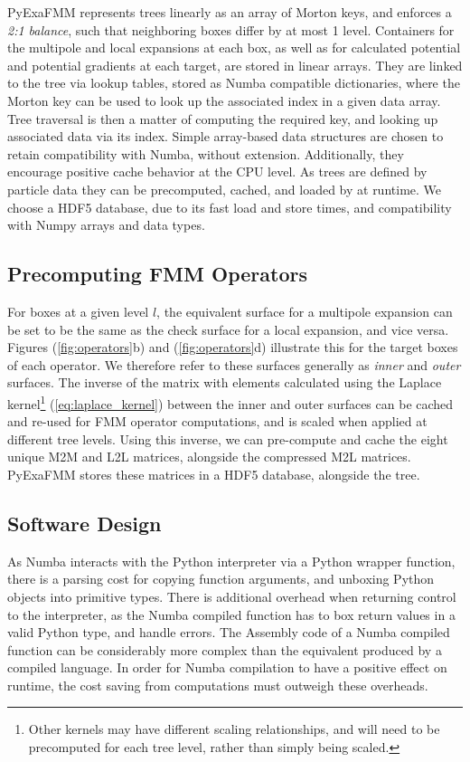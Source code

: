 \documentclass{IEEEcsmag}
\begin{document}
PyExaFMM represents trees linearly as an array of Morton keys, and enforces a \textit{2:1 balance}, such that neighboring boxes differ by at most 1 level. Containers for the multipole and local expansions at each box, as well as for calculated potential and potential gradients at each target, are stored in linear arrays. They are linked to the tree via lookup tables, stored as Numba compatible dictionaries, where the Morton key can be used to look up the associated index in a given data array. Tree traversal is then a matter of computing the required key, and looking up associated data via its index. Simple array-based data structures are chosen to retain compatibility with Numba, without extension. Additionally, they encourage positive cache behavior at the CPU level. As trees are defined by particle data they can be precomputed, cached, and loaded by at runtime. We choose a HDF5 database, due to its fast load and store times, and compatibility with Numpy arrays and data types.

\subsection{Precomputing FMM Operators}

For boxes at a given level $l$, the equivalent surface for a multipole expansion can be set to be the same as the check surface for a local expansion, and vice versa. Figures (\ref{fig:operators}b) and (\ref{fig:operators}d) illustrate this for the target boxes of each operator. We therefore refer to these surfaces generally as \textit{inner} and \textit{outer} surfaces. The inverse of the matrix with elements calculated using the Laplace kernel\footnote{Other kernels may have different scaling relationships, and will need to be precomputed for each tree level, rather than simply being scaled.} (\ref{eq:laplace_kernel}) between the inner and outer surfaces can be cached and re-used for FMM operator computations, and is scaled when applied at different tree levels. Using this inverse, we can pre-compute and cache the eight unique M2M and L2L matrices, alongside the compressed M2L matrices. PyExaFMM stores these matrices in a HDF5 database, alongside the tree.

\subsection{Software Design}

As Numba interacts with the Python interpreter via a Python wrapper function, there is a parsing cost for copying function arguments, and unboxing Python objects into primitive types. There is additional overhead when returning control to the interpreter, as the Numba compiled function has to box return values in a valid Python type, and handle errors. The Assembly code of a Numba compiled function can be considerably more complex than the equivalent produced by a compiled language. In order for Numba compilation to have a positive effect on runtime, the cost saving from computations must outweigh these overheads.
\end{document}
